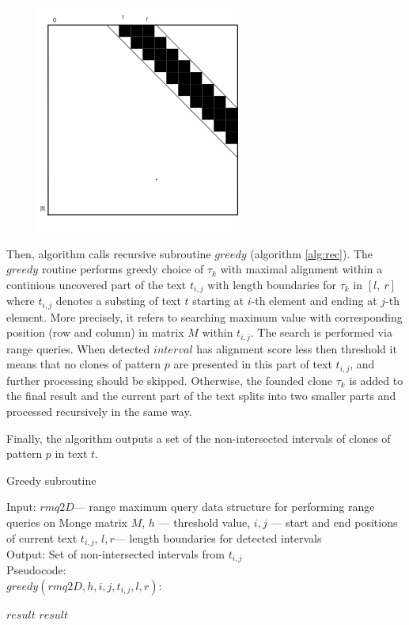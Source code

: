 \begin{figure}[!t]
  \centering
    \includegraphics[width=0.4\columnwidth]{figures/M1.png}
    \caption{}\label{figures:M1}
\end{figure}

Then, algorithm calls recursive subroutine $greedy$ (algorithm \ref{alg:rec}).
The $greedy$ routine performs greedy choice of $\tau_{k}$ with maximal alignment within a continious uncovered part of the text $t_{i,j}$ with length boundaries for $\tau_{k}$ in $[l,\ r]$ where $t_{i,j}$ denotes a substing of text $t$ starting at $i$-th element and ending at $j$-th element.
More precisely, it refers to searching maximum value with corresponding position (row and column) in matrix $M$ within $t_{i,j}$.
The search is performed via range queries.
When detected $interval$ has alignment score less then threshold it means that no clones of pattern $p$ are presented in this part of text $t_{i,j}$, and further processing should be skipped.
Otherwise, the founded clone $\tau_k$ is added to the final result and the current part of the text splits into two smaller parts and processed recursively in the same way.

Finally, the algorithm outputs a set of the non-intersected intervals of clones of pattern $p$ in text $t$.


\begin{algorithm}[!t]
\caption{Greedy subroutine}
\label{alg:rec}
Input: $rmq2D$--- range maximum query data structure for performing range queries on Monge matrix $M$, $h$ --- threshold value, $i,j$ --- start and end positions of current text $t_{i,j}$, $l,r$--- length boundaries for detected intervals \\
Output: Set of non-intersected intervals from $t_{i,j}$\\
Pseudocode:\\
$greedy(rmq2D,h, i, j, t_{i,j},l,r ):$

\begin{algorithmic}[1]
\RETURN $result$
\ENDIF
{}
\ENDIF
{}
\ENDIF
\RETURN $result$
\end{algorithmic}
\end{algorithm}


